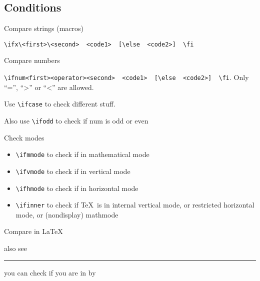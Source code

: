 \subsection{Conditions}

\begin{frame}[fragile]{Compare strings (macros)\tW\magicPage}\relax


    {\csk \verb|\ifx\<first>\<second>  <code1>  [\else  <code2>]  \fi|}
    
\end{frame}

\begin{frame}[fragile]{Compare numbers\tW\magicPage}\relax


    {\csk \verb|\ifnum<first><operator><second>  <code1>  [\else  <code2>]  \fi|}. Only ``='', ``>'' or ``<'' are allowed.
    
    Use {\csk \verb|\ifcase|} to check different stuff.
    
    Also use {\csk \verb|\ifodd|} to check if num is odd or even
    
\end{frame}

\begin{frame}[fragile]{Check modes\tW\magicPage}\relax

\begin{itemize}
    \item {\csk\verb|\ifmmode|} to check if in mathematical mode
    \item {\csk\verb|\ifvmode|} to check if in vertical mode
    \item {\csk\verb|\ifhmode|} to check if in horizontal mode
    \item {\csk\verb|\ifinner|} to check if \TeX\ is in internal vertical mode, or restricted horizontal mode, or (nondisplay) mathmode
     
\end{itemize}

\end{frame}


\begin{frame}{Compare in \LaTeX\lW\magicPage}\relax
{}  
      \ncol\usepackage{xstring}
      
      also see \ncol\usepackage{ifthen}
      
      \hrule 
      
      you can check if you are in \XeLaTeX by \ncol\usepackage{ifxetex}
      
\end{frame}

